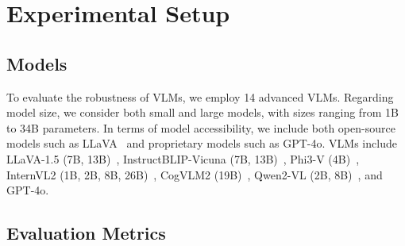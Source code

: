\section{Experimental Setup}
\label{sec:experimental_setup}


\subsection{Models}



To evaluate the robustness of VLMs, we employ 14 advanced VLMs. Regarding model size, we consider both small and large models, with sizes ranging from 1B to 34B parameters. In terms of model accessibility, we include both open-source models such as LLaVA~\citep{liu2023llava} and proprietary models such as GPT-4o. VLMs include LLaVA-1.5 (7B, 13B)~\citep{liu2023llava}, InstructBLIP-Vicuna (7B, 13B)~\citep{dai2023instructblip}, Phi3-V (4B)~\citep{phi3vfinetuning2023}, InternVL2 (1B, 2B, 8B, 26B)~\citep{chen2024far}, CogVLM2 (19B)~\citep{hong2024cogvlm2visuallanguagemodels}, Qwen2-VL (2B, 8B)~\citep{wang2024qwen2vlenhancingvisionlanguagemodels}, and GPT-4o. 

\subsection{Evaluation Metrics}

